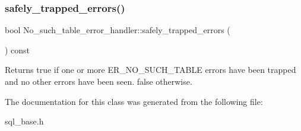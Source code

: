 \subsubsection{\texorpdfstring{safely\+\_\+trapped\+\_\+errors()}{safely\_trapped\_errors()}}
{\footnotesize\ttfamily bool No\+\_\+such\+\_\+table\+\_\+error\+\_\+handler\+::safely\+\_\+trapped\+\_\+errors (\begin{DoxyParamCaption}{ }\end{DoxyParamCaption}) const\hspace{0.3cm}{\ttfamily [inline]}}

Returns true if one or more E\+R\+\_\+\+N\+O\+\_\+\+S\+U\+C\+H\+\_\+\+T\+A\+B\+LE errors have been trapped and no other errors have been seen. false otherwise. 

The documentation for this class was generated from the following file\+:\begin{DoxyCompactItemize}
\item 
sql\+\_\+base.\+h\end{DoxyCompactItemize}
